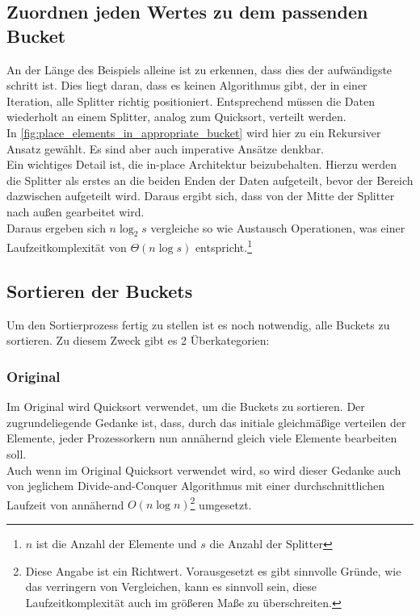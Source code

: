 	\subsection{Zuordnen jeden Wertes zu dem passenden Bucket}
		
		An der Länge des Beispiels alleine ist zu erkennen, dass dies der aufwändigste schritt ist.
		Dies liegt daran, dass es keinen Algorithmus gibt, der in einer Iteration, alle Splitter richtig positioniert.
		Entsprechend müssen die Daten wiederholt an einem Splitter, analog zum Quicksort, verteilt werden.\\
		In \ref{fig:place_elements_in_appropriate_bucket} wird hier zu ein Rekursiver Ansatz gewählt.
		Es sind aber auch imperative Ansätze denkbar.\\
		Ein wichtiges Detail ist, die in-place Architektur beizubehalten.
		Hierzu werden die Splitter als erstes an die beiden Enden der Daten aufgeteilt, bevor der Bereich dazwischen aufgeteilt wird.
		Daraus ergibt sich, dass von der Mitte der Splitter nach außen gearbeitet wird.\\
		Daraus ergeben sich $n\log_2s$ vergleiche so wie Austausch Operationen, was einer Laufzeitkomplexität von $\Theta(n\log{s})$ entspricht.\footnote{$n$ ist die Anzahl der Elemente und $s$ die Anzahl der Splitter}

	\subsection{Sortieren der Buckets}
		Um den Sortierprozess fertig zu stellen ist es noch notwendig, alle Buckets zu sortieren.
		Zu diesem Zweck gibt es 2 Überkategorien:
		\subsubsection{Original}
			Im Original \autocite{frazer-1970} wird Quicksort verwendet, um die Buckets zu sortieren.
			Der zugrundeliegende Gedanke ist, dass, durch das initiale gleichmäßige verteilen der Elemente, jeder Prozessorkern nun annähernd gleich viele Elemente bearbeiten soll.\\
			Auch wenn im Original Quicksort verwendet wird, so wird dieser Gedanke auch von jeglichem Divide-and-Conquer Algorithmus mit einer durchschnittlichen Laufzeit von annähernd $O(n\log{n})$\footnote{Diese Angabe ist ein Richtwert. Vorausgesetzt es gibt sinnvolle Gründe, wie das verringern von Vergleichen, kann es sinnvoll sein, diese Laufzeitkomplexität auch im größeren Maße zu überschreiten.} umgesetzt. 
